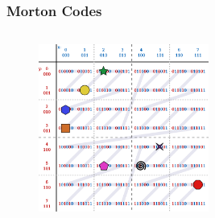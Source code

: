 \documentclass{beamer}
\begin{document}
\begin{frame}
  \frametitle{Morton Codes}
  
\begin{columns}[t]

\begin{figure}
\includegraphics[height=55mm]{Z-curve-primitives.png}
\end{figure}

\begin{figure}
\end{figure}
\end{columns}
\end{frame}
\end{document}
